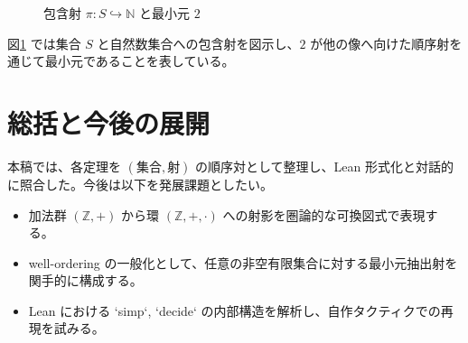 \documentclass[a4paper]{ltjsarticle}
\begin{document}
\begin{figure}[htbp]
  \centering
  \caption{包含射 $\pi : S \hookrightarrow \mathbb{N}$ と最小元 $2$}
  \label{fig:wellordering}
\end{figure}

図\ref{fig:wellordering} では集合 $S$ と自然数集合への包含射を図示し、$2$ が他の像へ向けた順序射を通じて最小元であることを表している。

\section{総括と今後の展開}
本稿では、各定理を $(\text{集合}, \text{射})$ の順序対として整理し、Lean 形式化と対話的に照合した。今後は以下を発展課題としたい。
\begin{itemize}
  \item 加法群 $(\mathbb{Z}, +)$ から環 $(\mathbb{Z}, +, \cdot)$ への射影を圏論的な可換図式で表現する。
  \item well-ordering の一般化として、任意の非空有限集合に対する最小元抽出射を関手的に構成する。
  \item Lean における `simp`, `decide` の内部構造を解析し、自作タクティクでの再現を試みる。
\end{itemize}
\end{document}
